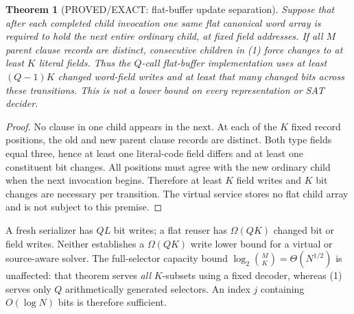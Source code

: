 \documentclass[11pt]{article}
\newtheorem{theorem}{Theorem}
\begin{document}
\begin{theorem}[PROVED/EXACT: flat-buffer update separation]
Suppose that after each completed child invocation one \emph{same}
flat canonical word array is required to hold the next entire
ordinary child, at fixed field addresses. If all $M$ parent clause
records are distinct, consecutive children in (1) force changes to
at least $K$ literal fields. Thus the $Q$-call flat-buffer
implementation uses at least $(Q-1)K$ changed word-field writes
and at least that many changed \emph{bits} across these transitions.
This is not a lower bound on every representation or SAT decider.
\end{theorem}
\begin{proof}
No clause in one child appears in the next. At each of the $K$
fixed record positions, the old and new parent clause records
are distinct. Both type fields equal three, hence at least one
literal-code field differs and at least one constituent bit changes.
All positions must agree with the new ordinary child when the
next invocation begins. Therefore at least $K$ field writes and
$K$ bit changes are necessary per transition. The virtual service
stores no flat child array and is not subject to this premise.
\end{proof}
A fresh serializer has $QL$ bit writes; a flat reuser
has $\Omega(QK)$ changed bit or field writes. Neither establishes
a $\Omega(QK)$ write lower bound for a virtual or source-aware solver.
The full-selector capacity bound
$\log_2\binom MK=\Theta(N^{1/2})$ is unaffected:
that theorem serves \emph{all} $K$-subsets using a fixed decoder,
whereas (1) serves only $Q$ arithmetically generated selectors.
An index $j$ containing $O(\log N)$ bits is therefore sufficient.
\end{document}
